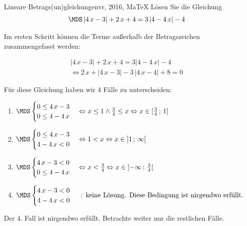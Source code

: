  \providecommand{\MoIl}[1][]{\mbox{}#1]\mathopen{}} 
 \providecommand{\MoIr}[1][]{#1[\mbox{}} 
 \providecommand{\MIntvlSep}{;} 
 \providecommand{\MElSetSep}{\, ; \, } 
 \begin{MAufgabe}{Lineare Betrags(un)gleichungen}{vr, 2016, MaTeX}
L\"osen Sie die Gleichung
$$
 \MDS \left| 4\, x - 3 \right|+2\, x + 4= 3 \left| 4 - 4\, x \right| -4
$$  

\ifLsg\MLoesung

Im ersten Schritt k\"onnen die Terme au\ss{}erhalb der Betragszeichen zusammengefasst werden:

\begin{align*} 
 \left| 4\, x - 3 \right|+2\, x + 4= 3 \left| 4 - 4\, x \right| -4\\ 
\Leftrightarrow2\, x + \left|4\, x - 3\right| - 3\, \left|4\, x - 4\right| + 8= 0 
 \end{align*}

F\"ur diese Gleichung haben wir 4 F\"alle zu unterscheiden: 
\begin{enumerate}
\item $ \MDS 
\begin{cases} 
 0 \leq 4\, x - 3\\ 
0 \leq 4 - 4\, x
 \end{cases}
\Leftrightarrow x \leq 1 \wedge \frac{3}{4} \leq x\Leftrightarrow x \in [ \frac{3}{4} \, \MIntvlSep \, 1]$ 
\item $ \MDS 
\begin{cases} 
 0 \leq 4\, x - 3\\ 
4 - 4\, x < 0
 \end{cases}
\Leftrightarrow 1 < x\Leftrightarrow x \in \MoIl  1 \, \MIntvlSep \, \infty\MoIr $ 
\item $ \MDS 
\begin{cases} 
 4\, x - 3 < 0\\ 
0 \leq 4 - 4\, x
 \end{cases}
\Leftrightarrow x < \frac{3}{4}\Leftrightarrow x \in \MoIl  -\infty \, \MIntvlSep \, \frac{3}{4}\MoIr $ 
\item $ \MDS 
\begin{cases} 
 4\, x - 3 < 0\\ 
4 - 4\, x < 0
 \end{cases}
 \mbox{ : keine L\"osung. Diese Bedingung ist nirgendwo erf\"ullt.}$ 
\end{enumerate} 
Der 4. Fall ist nirgendwo erf\"ullt. Betrachte weiter nur die restlichen F\"alle.
 

\end{MAufgabe}
